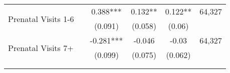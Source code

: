 \begin{table}[H]
\begin{footnotesize}
\begin{center}
{\begin{threeparttable}[b]
\begin{tabular}{rrrrrr}
    \multicolumn{1}{l}{\multirow{2}[0]{*}{Prenatal Visits 1-6}} &       & \multicolumn{1}{c}{0.388***} & \multicolumn{1}{c}{0.132**} & \multicolumn{1}{c}{0.122**} & \multicolumn{1}{c}{   64,327 } \\
          &       & \multicolumn{1}{c}{(0.091)} & \multicolumn{1}{c}{(0.058)} & \multicolumn{1}{c}{(0.06)} &  \\
    \multicolumn{1}{l}{\multirow{2}[0]{*}{Prenatal Visits 7+}} &       & \multicolumn{1}{c}{-0.281***} & \multicolumn{1}{c}{-0.046} & \multicolumn{1}{c}{-0.03} & \multicolumn{1}{c}{   64,327 } \\
          &       & \multicolumn{1}{c}{(0.099)} & \multicolumn{1}{c}{(0.075)} & \multicolumn{1}{c}{(0.062)} &  \\
          &       &       &       &       &  \\
    \midrule
    \midrule
          &       &       &       &       &  \\
    \end{tabular}%
    
  \label{table:access}%

\end{threeparttable}
}
\end{center}
\end{footnotesize}
\end{table}
